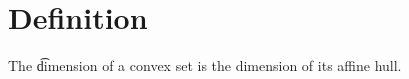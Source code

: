 
\section*{Definition}

The \t{dimension} of a convex set is the dimension of its affine hull.

\blankpage